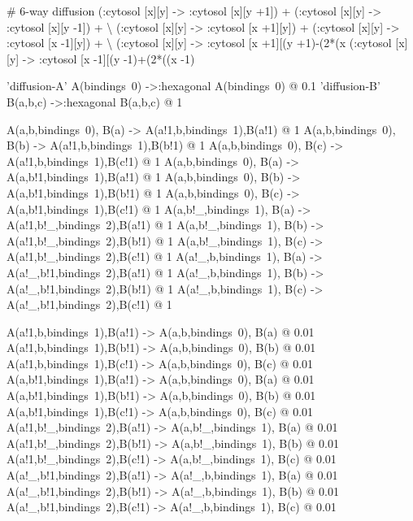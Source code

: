 \begin{kappasource}


# 6-way diffusion
    (:cytosol [x][y] -> :cytosol [x][y +1]) + (:cytosol [x][y] -> :cytosol [x][y -1]) + {\textbackslash}
    (:cytosol [x][y] -> :cytosol [x +1][y]) + (:cytosol [x][y] -> :cytosol [x -1][y]) + {\textbackslash}
    (:cytosol [x][y] -> :cytosol [x +1][(y +1)-(2*(x%
    (:cytosol [x][y] -> :cytosol [x -1][(y -1)+(2*((x -1)%

'diffusion-A' A(bindings~0) ->:hexagonal A(bindings~0) @ 0.1
'diffusion-B' B(a,b,c) ->:hexagonal B(a,b,c) @ 1

A(a,b,bindings~0), B(a) -> A(a!1,b,bindings~1),B(a!1) @ 1
A(a,b,bindings~0), B(b) -> A(a!1,b,bindings~1),B(b!1) @ 1
A(a,b,bindings~0), B(c) -> A(a!1,b,bindings~1),B(c!1) @ 1
A(a,b,bindings~0), B(a) -> A(a,b!1,bindings~1),B(a!1) @ 1
A(a,b,bindings~0), B(b) -> A(a,b!1,bindings~1),B(b!1) @ 1
A(a,b,bindings~0), B(c) -> A(a,b!1,bindings~1),B(c!1) @ 1
A(a,b!_,bindings~1), B(a) -> A(a!1,b!_,bindings~2),B(a!1) @ 1
A(a,b!_,bindings~1), B(b) -> A(a!1,b!_,bindings~2),B(b!1) @ 1
A(a,b!_,bindings~1), B(c) -> A(a!1,b!_,bindings~2),B(c!1) @ 1
A(a!_,b,bindings~1), B(a) -> A(a!_,b!1,bindings~2),B(a!1) @ 1
A(a!_,b,bindings~1), B(b) -> A(a!_,b!1,bindings~2),B(b!1) @ 1
A(a!_,b,bindings~1), B(c) -> A(a!_,b!1,bindings~2),B(c!1) @ 1

A(a!1,b,bindings~1),B(a!1) -> A(a,b,bindings~0), B(a) @ 0.01
A(a!1,b,bindings~1),B(b!1) -> A(a,b,bindings~0), B(b) @ 0.01
A(a!1,b,bindings~1),B(c!1) -> A(a,b,bindings~0), B(c) @ 0.01
A(a,b!1,bindings~1),B(a!1) -> A(a,b,bindings~0), B(a) @ 0.01
A(a,b!1,bindings~1),B(b!1) -> A(a,b,bindings~0), B(b) @ 0.01
A(a,b!1,bindings~1),B(c!1) -> A(a,b,bindings~0), B(c) @ 0.01
A(a!1,b!_,bindings~2),B(a!1) -> A(a,b!_,bindings~1), B(a) @ 0.01
A(a!1,b!_,bindings~2),B(b!1) -> A(a,b!_,bindings~1), B(b) @ 0.01
A(a!1,b!_,bindings~2),B(c!1) -> A(a,b!_,bindings~1), B(c) @ 0.01
A(a!_,b!1,bindings~2),B(a!1) -> A(a!_,b,bindings~1), B(a) @ 0.01
A(a!_,b!1,bindings~2),B(b!1) -> A(a!_,b,bindings~1), B(b) @ 0.01
A(a!_,b!1,bindings~2),B(c!1) -> A(a!_,b,bindings~1), B(c) @ 0.01


\end{kappasource}

